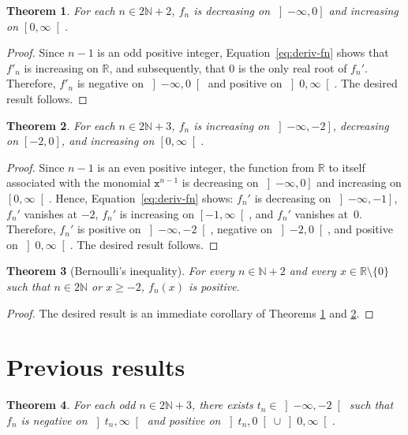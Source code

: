 \documentclass[12pt]{article}
\newcommand{\bR}{\mathbb{R}}
\newcommand{\bN}{\mathbb{N}}
\newcommand{\gtint}[1]{\left] #1, \infty \right[}
\newcommand{\geint}[1]{\left[ #1, \infty \right[}
\newcommand{\ltint}[1]{\left]- \infty, #1 \right[}
\newcommand{\leint}[1]{\left]- \infty, #1 \right]}
\newcommand{\ttx}{\mathtt{x}}
\newtheorem{theorem}{Theorem}
\begin{document}
 \begin{theorem} \label{thm:variation-even}
   For each $n \in 2 \bN + 2$,
   $f_n$ is
   decreasing on $\leint{0}$ and
   increasing on $\geint{0}$.
 \end{theorem}

 \begin{proof}
   Since $n - 1$ is an odd positive integer,
   Equation~\eqref{eq:deriv-fn} shows that
   $f'_n$ is increasing on $\bR$,
   and subsequently, that
   $0$ is the only real root of $f_n'$.
   Therefore,
   $f'_n$ is negative on $\ltint{0}$
   and 
   positive on $\gtint{0}$.
   The desired result follows.
 \end{proof}


 \begin{theorem} \label{thm:variation-odd}
   For each $n \in 2 \bN + 3$, $f_n$ is
   increasing on $\leint{- 2}$,
   decreasing on $[- 2, 0]$, and
   increasing on $\geint{0}$.
 \end{theorem}

 \begin{proof}
   Since $n - 1$ is an even positive integer,
   the function from $\bR$ to itself associated with the monomial $\ttx^{n - 1}$ is
   decreasing on $\leint{0}$ and
   increasing on $\geint{0}$.
   Hence, 
   Equation~\eqref{eq:deriv-fn} shows: 
   $f_n'$ is decreasing on $\leint{- 1}$,
   $f_n'$ vanishes at $- 2$,
   $f_n'$ is increasing on $\geint{- 1}$, and
   $f_n'$ vanishes at~$0$.
   Therefore, $f_n'$ is positive on $\ltint{- 2}$,
   negative on $\left]- 2, 0 \right[$, and
   positive on $\gtint{0}$.
   The desired result follows.
 \end{proof}

 \begin{theorem}[Bernoulli's inequality]
   \label{thm:Bernoulli}
   For every $n \in \bN + 2$ and every $x \in \bR \setminus \{ 0 \}$ such that $n \in 2 \bN$ or $x \ge - 2$,
   $f_n(x)$ is positive.
 \end{theorem}

 \begin{proof}
   The desired result is an immediate corollary of Theorems \ref{thm:variation-even} and \ref{thm:variation-odd}.
 \end{proof}

 \section{Previous results} 
 
 \begin{theorem} \label{thm:tipping-point}
   For each odd  $n \in 2 \bN + 3$,
   there exists $t_n \in \ltint{- 2}$ such that $f_n$ is 
   negative on $\gtint{t_n}$
   and
   positive on $\left]t_n, 0 \right[ \cup \gtint{0}$.
 \end{theorem} 
\end{document}
